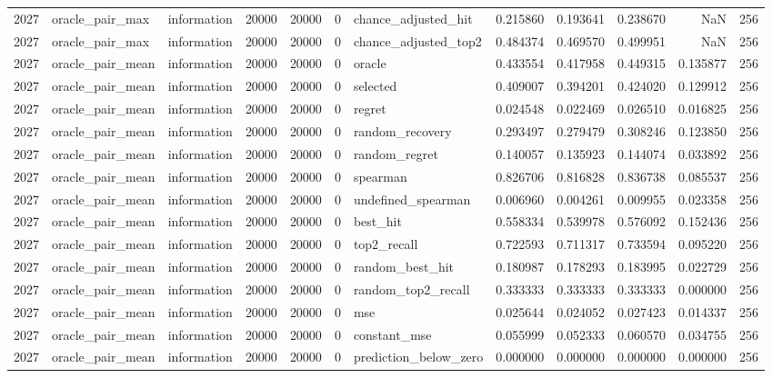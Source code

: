 \begin{tabular}{rllrrrlrrrrr}
2027 & oracle_pair_max & information & 20000 & 20000 & 0 & chance_adjusted_hit & 0.215860 & 0.193641 & 0.238670 & NaN & 256 \\
2027 & oracle_pair_max & information & 20000 & 20000 & 0 & chance_adjusted_top2 & 0.484374 & 0.469570 & 0.499951 & NaN & 256 \\
2027 & oracle_pair_mean & information & 20000 & 20000 & 0 & oracle & 0.433554 & 0.417958 & 0.449315 & 0.135877 & 256 \\
2027 & oracle_pair_mean & information & 20000 & 20000 & 0 & selected & 0.409007 & 0.394201 & 0.424020 & 0.129912 & 256 \\
2027 & oracle_pair_mean & information & 20000 & 20000 & 0 & regret & 0.024548 & 0.022469 & 0.026510 & 0.016825 & 256 \\
2027 & oracle_pair_mean & information & 20000 & 20000 & 0 & random_recovery & 0.293497 & 0.279479 & 0.308246 & 0.123850 & 256 \\
2027 & oracle_pair_mean & information & 20000 & 20000 & 0 & random_regret & 0.140057 & 0.135923 & 0.144074 & 0.033892 & 256 \\
2027 & oracle_pair_mean & information & 20000 & 20000 & 0 & spearman & 0.826706 & 0.816828 & 0.836738 & 0.085537 & 256 \\
2027 & oracle_pair_mean & information & 20000 & 20000 & 0 & undefined_spearman & 0.006960 & 0.004261 & 0.009955 & 0.023358 & 256 \\
2027 & oracle_pair_mean & information & 20000 & 20000 & 0 & best_hit & 0.558334 & 0.539978 & 0.576092 & 0.152436 & 256 \\
2027 & oracle_pair_mean & information & 20000 & 20000 & 0 & top2_recall & 0.722593 & 0.711317 & 0.733594 & 0.095220 & 256 \\
2027 & oracle_pair_mean & information & 20000 & 20000 & 0 & random_best_hit & 0.180987 & 0.178293 & 0.183995 & 0.022729 & 256 \\
2027 & oracle_pair_mean & information & 20000 & 20000 & 0 & random_top2_recall & 0.333333 & 0.333333 & 0.333333 & 0.000000 & 256 \\
2027 & oracle_pair_mean & information & 20000 & 20000 & 0 & mse & 0.025644 & 0.024052 & 0.027423 & 0.014337 & 256 \\
2027 & oracle_pair_mean & information & 20000 & 20000 & 0 & constant_mse & 0.055999 & 0.052333 & 0.060570 & 0.034755 & 256 \\
2027 & oracle_pair_mean & information & 20000 & 20000 & 0 & prediction_below_zero & 0.000000 & 0.000000 & 0.000000 & 0.000000 & 256 \\

\end{tabular}
